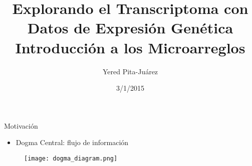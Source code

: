 \documentclass{beamer}
\begin{document}
\title[Introducción a la Expresión Genética]{Explorando el Transcriptoma con Datos de Expresi\'{o}n Gen\'{e}tica\\
\vspace{0.5cm}
Introducción a los Microarreglos}
\author{Yered Pita-Ju\'{a}rez}
\date{3/1/2015}


\begin{frame}
\titlepage
\end{frame}


\begin{frame}{Motivación}
\begin{itemize}
\item Dogma Central: flujo de información
\end{itemize}
\begin{figure}[H]
\centering
\texttt{[image: dogma\_diagram.png]}
\end{figure}
\end{frame}





%
%
\end{document}
